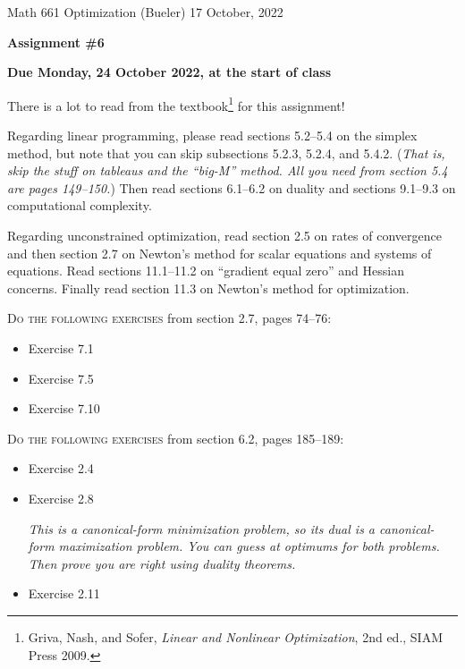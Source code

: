 \documentclass[12pt]{amsart}
\begin{document}
\scriptsize \noindent Math 661 Optimization (Bueler) \hfill 17 October, 2022
\normalsize

\medskip\bigskip

\Large\centerline{\textbf{Assignment \#6}}
\large
\bigskip

\centerline{\textbf{Due Monday, 24 October 2022, at the start of class}}
\bigskip
\normalsize

\thispagestyle{empty}

\bigskip
There is a lot to read from the textbook\footnote{Griva, Nash, and Sofer, \emph{Linear and Nonlinear Optimization}, 2nd ed., SIAM Press 2009.} for this assignment!

Regarding linear programming, please read sections 5.2--5.4 on the simplex method, but note that you can skip subsections 5.2.3, 5.2.4, and 5.4.2.  (\emph{That is, skip the stuff on tableaus and the ``big-M'' method.  All you need from section 5.4 are pages 149--150.})  Then read sections 6.1--6.2 on duality and sections 9.1--9.3 on computational complexity.

Regarding unconstrained optimization, read section 2.5 on rates of convergence and then section 2.7 on Newton's method for scalar equations and systems of equations.  Read sections 11.1--11.2 on ``gradient equal zero'' and Hessian concerns.  Finally read section 11.3 on Newton's method for optimization.

\bigskip
\noindent \textsc{Do the following exercises} from section 2.7, pages 74--76:

\begin{itemize}
\item Exercise 7.1
\item Exercise 7.5
\item Exercise 7.10
\end{itemize}

\bigskip
\noindent \textsc{Do the following exercises} from section 6.2, pages 185--189:

\begin{itemize}
\item Exercise 2.4
\item Exercise 2.8  \quad \begin{minipage}[t]{4.0in}
\emph{This is a canonical-form minimization problem, so its dual is a canonical-form maximization problem.  You can guess at optimums for both problems.  Then prove you are right using duality theorems.}
\end{minipage}
\item Exercise 2.11
\end{itemize}
\end{document}

